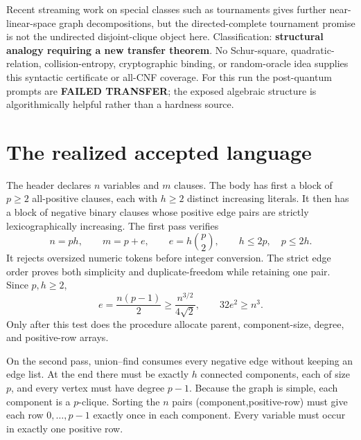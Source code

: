 \documentclass[11pt]{article}
\begin{document}
Recent streaming work on special classes such as tournaments gives further
near-linear-space graph decompositions, but the directed-complete tournament
promise is not the undirected disjoint-clique object here.  Classification:
\textbf{structural analogy requiring a new transfer theorem}.  No Schur-square,
quadratic-relation, collision-entropy, cryptographic binding, or random-oracle
idea supplies this syntactic certificate or all-CNF coverage.  For this run
the post-quantum prompts are \textbf{FAILED TRANSFER}; the exposed algebraic
structure is algorithmically helpful rather than a hardness source.

\section{The realized accepted language}
The header declares $n$ variables and $m$ clauses.  The body has first a block
of $p\ge2$ all-positive clauses, each with $h\ge2$ distinct increasing
literals.  It then has a block of negative binary clauses whose positive edge
pairs are strictly lexicographically increasing.  The first pass verifies
\[
 n=ph,\qquad m=p+e,\qquad e=h\binom p2,
 \qquad h\le2p,\quad p\le2h.
\]
It rejects oversized numeric tokens before integer conversion.  The strict
edge order proves both simplicity and duplicate-freedom while retaining one
pair.  Since $p,h\ge2$,
\[
 e=\frac{n(p-1)}2\ge\frac{n^{3/2}}{4\sqrt2},
 \qquad 32e^2\ge n^3.
\]
Only after this test does the procedure allocate parent, component-size,
degree, and positive-row arrays.

On the second pass, union--find consumes every negative edge without keeping
an edge list.  At the end there must be exactly $h$ connected components,
each of size $p$, and every vertex must have degree $p-1$.  Because the graph
is simple, each component is a $p$-clique.  Sorting the $n$ pairs
(component,positive-row) must give each row $0,\ldots,p-1$ exactly once in
each component.  Every variable must occur in exactly one positive row.
\end{document}
